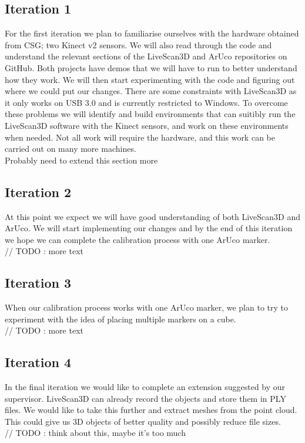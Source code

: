 \documentclass[a4paper,12pt]{article}
\begin{document}
\subsection*{Iteration 1}
For the first iteration we plan to familiarise ourselves with the hardware obtained from CSG; two Kinect v2 sensors. We will also read through the code and understand the relevant sections of the LiveScan3D and ArUco repositories on GitHub. Both projects have demos that we will have to run to better understand how they work. We will then start experimenting with the code and figuring out where we could put our changes.
There are some constraints with LiveScan3D as it only works on USB 3.0 and is currently restricted to Windows. To overcome these problems we will identify and build environments that can suitibly run the LiveScan3D software with the Kinect sensors, and work on these environments when needed. Not all work will require the hardware, and this work can be carried out on many more machines.
\\
Probably need to extend this section more

\subsection*{Iteration 2}
\iffalse
The calibration process in LiveScan3D is currently a bit cumbersome. The idea is to use ArUco to simplify this, and also possibly make it more accurate. Yes, you can use multiple markers, maybe even arranged on 3D objects like cubes. We can discuss details on Wednesday. A simplified calibration process would be important in the context of using something like LiveScan3D as a portable 3D recording tool.
\fi
At this point we expect we will have good understanding of both LiveScan3D and ArUco. We will start implementing our changes and by the end of this iteration we hope we can complete the calibration process with one ArUco marker.  \\
// TODO : more text

\subsection*{Iteration 3}
When our calibration process works with one ArUco marker, we plan to try to experiment with the idea of placing multiple markers on a cube. \\
// TODO : more text

\subsection*{Iteration 4}
\iffalse
You don't necessarily need to generate meshes from the recordings. You could keep it as a set of 3D points (probably stored in some efficient data structure). When doing playback, you simply render the points but should allow the virtual camera to change.
\fi
In the final iteration we would like to complete an extension suggested by our supervisor. LiveScan3D can already record the objects and store them in PLY files. We would like to take this further and extract meshes from the point cloud. This could give us 3D objects of better quality and possibly reduce file sizes. \\
// TODO : think about this, maybe it's too much
\end{document}
